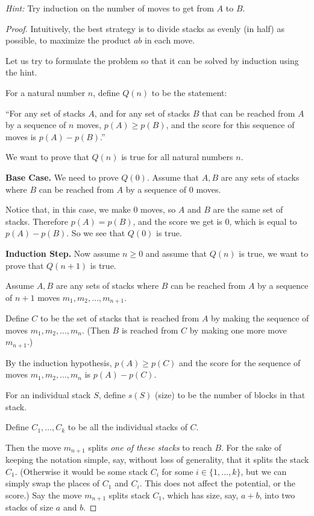 \documentclass[14pt]{extarticle}
\begin{document}
\textit{Hint:} Try induction on the number of moves to get from $A$ to $B$.
\begin{proof}
Intuitively, the best strategy is to divide stacks as evenly (in half) as possible, to maximize the product $ab$ in each move.

Let us try to formulate the problem so that it can be solved by induction using the hint.

For a natural number $n$, define $Q(n)$ to be the statement: 

``For any set of stacks $A$, and for any set of stacks $B$ that can be reached from $A$ by a sequence of $n$ moves, $p(A) \geq p(B)$, and the score for this sequence of moves is $p(A) - p(B)$.''

We want to prove that $Q(n)$ is true for all natural numbers $n$.

\textbf{Base Case.} We need to prove $Q(0)$. Assume that $A, B$ are any sets of stacks where $B$ can be reached from $A$ by a sequence of 0 moves.

Notice that, in this case, we make 0 moves, so $A$ and $B$ are the same set of stacks. Therefore $p(A) = p(B)$, and the score we get is 0, which is equal to $p(A) - p(B)$. So we see that $Q(0)$ is true.

\textbf{Induction Step.} Now assume $n \geq 0$ and assume that $Q(n)$ is true, we want to prove that $Q(n+1)$ is true.

Assume $A,B$ are any sets of stacks where $B$ can be reached from $A$ by a sequence of $n+1$ moves $m_1, m_2, \ldots, m_{n+1}$.

Define $C$ to be the set of stacks that is reached from $A$ by making the sequence of moves $m_1, m_2, \ldots, m_{n}$. (Then $B$ is reached from $C$ by making one more move $m_{n+1}$.)

By the induction hypothesis, $p(A) \geq p(C)$ and the score for the sequence of moves $m_1, m_2, \ldots, m_{n}$ is $p(A) - p(C)$.

For an individual stack $S$, define $s(S)$ (size) to be the number of blocks in that stack.

Define $C_1, \ldots, C_k$ to be all the individual stacks of $C$.

Then the move $m_{n+1}$ splits \textit{one of these stacks} to reach $B$. For the sake of keeping the notation simple, say, without loss of generality, that it splits the stack $C_1$. (Otherwise it would be some stack $C_i$ for some $i \in \{1, \ldots, k\}$, but we can simply swap the places of $C_1$ and $C_i$. This does not affect the potential, or the score.) Say the move $m_{n+1}$ splits stack $C_1$, which has size, say, $a + b$, into two stacks of size $a$ and $b$.


\end{proof}
\end{document}
